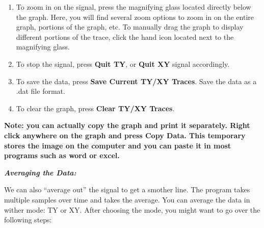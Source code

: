 \documentclass{../lab}
\begin{document}
\begin{enumerate}
    \item To zoom in on the signal, press the magnifying glass located directly below the graph. Here, you will find several zoom options to zoom in on the entire graph, portions of the graph, etc. To manually drag the graph to display different portions of the trace, click the hand icon located next to the magnifying glass.
    
    \item To stop the signal, press \textbf{Quit TY}, or \textbf{Quit XY} signal accordingly.
    
    \item To save the data, press \textbf{Save Current TY/XY Traces}. Save the data as a .dat file format.
    
    \item To clear the graph, press \textbf{Clear TY/XY Traces}.
\end{enumerate}

\textbf{Note: you can actually copy the graph and print it separately. Right click anywhere on the graph and press Copy Data. This temporary stores the image on the computer and you can paste it in most programs such as word or excel.}

\emph{\textbf{Averaging the Data:}}

We can also ``average out'' the signal to get a smother line. The program takes multiple samples over time and takes the average. You can average the data in wither mode: TY or XY. After choosing the mode, you might want to go over the following steps:
\end{document}

